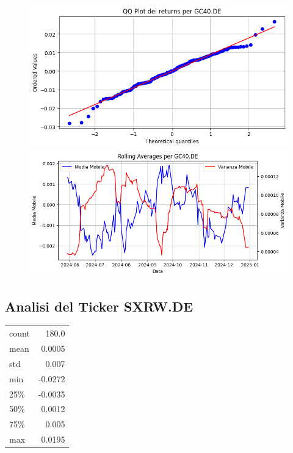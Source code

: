 \documentclass{article}%
\begin{document}
%


\begin{figure}[htbp]%
\begin{minipage}{0.48\textwidth}%
\includegraphics[width=\linewidth]{immagini_tickers/GC40.DE_qq_plot.png}%
\end{minipage}%
\begin{minipage}{0.48\textwidth}%
\includegraphics[width=\linewidth]{immagini_tickers/GC40.DE_rolling_averages.png}%
\end{minipage}%
\end{figure}

%
\subsection*{Analisi del Ticker SXRW.DE}%
\label{subsec:AnalisidelTickerSXRW.DE}%
\begin{tabular}{lr}%
count&180.0\\%
mean&0.0005\\%
std&0.007\\%
min&{-}0.0272\\%
25\%&{-}0.0035\\%
50\%&0.0012\\%
75\%&0.005\\%
max&0.0195\\%
\end{tabular}%
\end{document}
